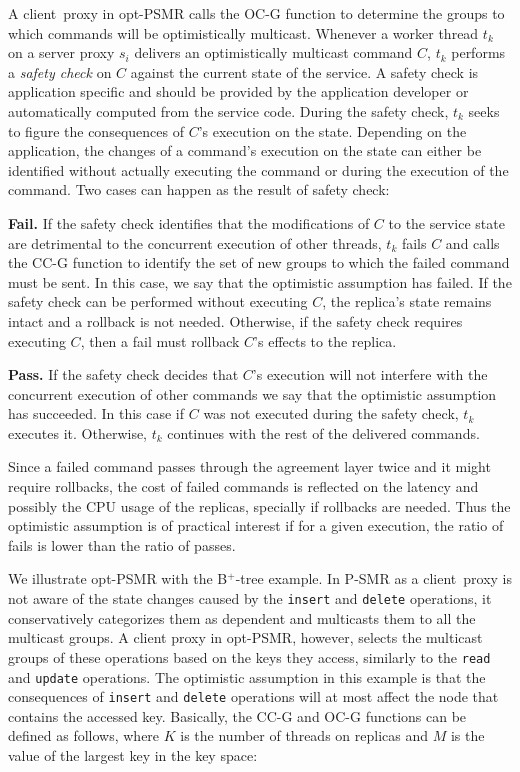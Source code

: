 \documentclass[conference]{IEEEtran}
\begin{document}
A client~proxy in opt-PSMR calls the OC-G function to determine the groups to which commands will be optimistically multicast. 
Whenever a worker thread $t_k$ on a server proxy $s_i$ delivers an optimistically multicast command $C$, $t_k$ performs a \emph{safety check} on $C$ against the current state of the service. 
A safety check is application specific and should be provided by the application developer or automatically computed from the service code. 
During the safety check, $t_k$ seeks to figure the consequences of $C$'s execution on the state. 
Depending on the application, the changes of a command's execution on the state can either be identified without actually executing the command or during the execution of the command. 
Two cases can happen as the result of safety check:



\noindent \textbf{Fail.} If the safety check identifies that the modifications of $C$ to the service state are detrimental to the concurrent execution of other threads, $t_k$ fails $C$ and calls the CC-G function to identify the set of new groups to which the failed command must be sent. 
In this case, we say that the optimistic assumption has failed. 
If the safety check can be performed without executing $C$, the replica's state remains intact and a rollback is not needed. Otherwise, if the safety check requires executing $C$, then a fail must rollback $C$'s effects to the replica. 


\noindent \textbf{Pass.} If the safety check decides that $C$'s execution will not interfere with the concurrent execution of other commands we say that the optimistic assumption has succeeded. In this case if $C$ was not executed during the safety check, $t_k$ executes it. Otherwise, $t_k$ continues with the rest of the delivered commands.

Since a failed command passes through the agreement layer twice and it might require rollbacks, the cost of failed commands is reflected on the latency and possibly the CPU usage of the replicas, specially if rollbacks are needed. 
Thus the optimistic assumption is of practical interest if for a given execution, the ratio of fails is lower than the ratio of passes.




We illustrate opt-PSMR with the B$^+$-tree example. In P-SMR as a client~proxy is not aware of the state changes caused by the \texttt{insert} and \texttt{delete} operations, it conservatively categorizes them as dependent and multicasts them to all the multicast groups. A client proxy in opt-PSMR, however, selects the multicast groups of these operations based on the keys they access, similarly to the \texttt{read} and \texttt{update} operations. The optimistic assumption in this example is that the consequences of \texttt{insert} and \texttt{delete} operations will at most affect the node that contains the accessed key. Basically, the CC-G and OC-G functions can be defined as follows, where $K$ is the number of threads on replicas and $M$ is the value of the largest key in the key space:
\end{document}
